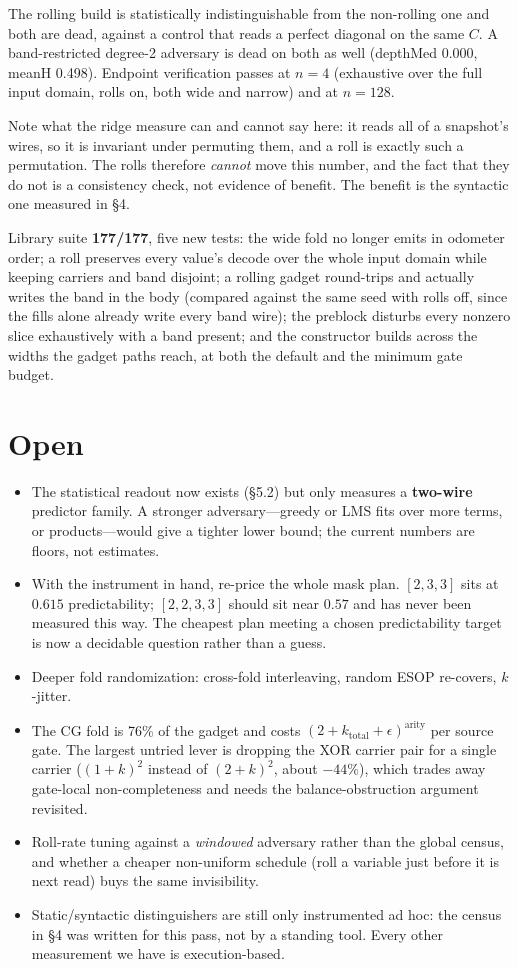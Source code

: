 \documentclass[11pt]{article}
\begin{document}
The rolling build is statistically indistinguishable from the non-rolling one
and both are dead, against a control that reads a perfect diagonal on the same
$C$. A band-restricted degree-2 adversary is dead on both as well (depthMed
0.000, meanH 0.498). Endpoint verification passes at $n{=}4$ (exhaustive over
the full input domain, rolls on, both wide and narrow) and at $n{=}128$.

Note what the ridge measure can and cannot say here: it reads all of a
snapshot's wires, so it is invariant under permuting them, and a roll is
exactly such a permutation. The rolls therefore \emph{cannot} move this number,
and the fact that they do not is a consistency check, not evidence of benefit.
The benefit is the syntactic one measured in \S4.

Library suite \textbf{177/177}, five new tests: the wide fold no longer emits
in odometer order; a roll preserves every value's decode over the whole input
domain while keeping carriers and band disjoint; a rolling gadget round-trips
and actually writes the band in the body (compared against the same seed with
rolls off, since the fills alone already write every band wire); the preblock
disturbs every nonzero slice exhaustively with a band present; and the
constructor builds across the widths the gadget paths reach, at both the
default and the minimum gate budget.

\section{Open}

\begin{itemize}
\item The statistical readout now exists (\S5.2) but only measures a
\textbf{two-wire} predictor family. A stronger adversary---greedy or LMS fits
over more terms, or products---would give a tighter lower bound; the current
numbers are floors, not estimates.
\item With the instrument in hand, re-price the whole mask plan. $[2,3,3]$
sits at $0.615$ predictability; $[2,2,3,3]$ should sit near $0.57$ and has never
been measured this way. The cheapest plan meeting a chosen predictability
target is now a decidable question rather than a guess.
\item Deeper fold randomization: cross-fold interleaving, random ESOP re-covers,
$k$-jitter.
\item The CG fold is 76\% of the gadget and costs
$(2+k_{\mathrm{total}}+\epsilon)^{\mathrm{arity}}$ per source gate. The largest
untried lever is dropping the XOR carrier pair for a single carrier
($(1+k)^2$ instead of $(2+k)^2$, about $-44\%$), which trades away gate-local
non-completeness and needs the balance-obstruction argument revisited.
\item Roll-rate tuning against a \emph{windowed} adversary rather than the
global census, and whether a cheaper non-uniform schedule (roll a variable just
before it is next read) buys the same invisibility.
\item Static/syntactic distinguishers are still only instrumented ad hoc: the
census in \S4 was written for this pass, not by a standing tool. Every other
measurement we have is execution-based.
\end{itemize}
\end{document}
